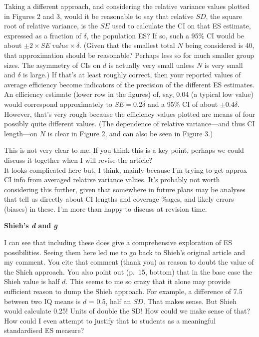 \documentclass[
  12pt,
  french,
]{article}
\begin{document}
\color{black} Taking a different approach, and considering the relative
variance values plotted in Figures 2 and 3, would it be reasonable to
say that relative \(SD\), the square root of relative variance, is the
\(SE\) used to calculate the CI on that ES estimate, expressed as a
fraction of \(\delta\), the population ES? If so, such a 95\(\%\) CI
would be about \(\pm 2 \times SE \; value \times \delta\). (Given that
the smallest total \(N\) being considered is 40, that approximation
should be reasonable? Perhaps less so for much smaller group sizes. The
asymmetry of CIs on \(d\) is actually very small unless \(N\) is very
small and \(\delta\) is large.) If that's at least roughly correct, then
your reported values of average efficiency become indicators of the
precision of the different ES estimates. An efficiency estimate (lower
row in the figures) of, say, 0.04 (a typical low value) would correspond
approximately to \(SE=0.2\delta\) and a 95\(\%\) CI of about
\(\pm 0.4 \delta\). However, that's very rough because the efficiency
values plotted are means of four possibly quite different values. (The
dependence of relative variance---and thus CI length---on \(N\) is clear
in Figure 2, and can also be seen in Figure 3.)

\color{blue} This is not very clear to me. If you think this is a key
point, perhaps we could discuss it together when I will revise the
article?\\
\color{brown} It looks complicated here but, I think, mainly because I'm
trying to get approx CI info from averaged relative variance values.
It's probably not worth considering this further, given that somewhere
in future plans may be analyses that tell us directly about CI lengths
and coverage \%ages, and likely errors (biases) in these. I'm more than
happy to discuss at revision time.

\color{black} \textbf{Shieh's \emph{d} and \emph{g}}

I can see that including these does give a comprehensive exploration of
ES possibilities. Seeing them here led me to go back to Shieh's original
article and my comment. You cite that comment (thank you) as reason to
doubt the value of the Shieh approach. You also point out (p.~15,
bottom) that in the base case the Shieh value is half \(d\). This seems
to me so crazy that it alone may provide sufficient reason to dump the
Shieh approach. For example, a difference of 7.5 between two IQ means is
\(d\) = 0.5, half an \(SD\). That makes sense. But Shieh would calculate
0.25! Units of double the SD! How could we make sense of that? How could
I even attempt to justify that to students as a meaningful standardised
ES measure?
\end{document}
